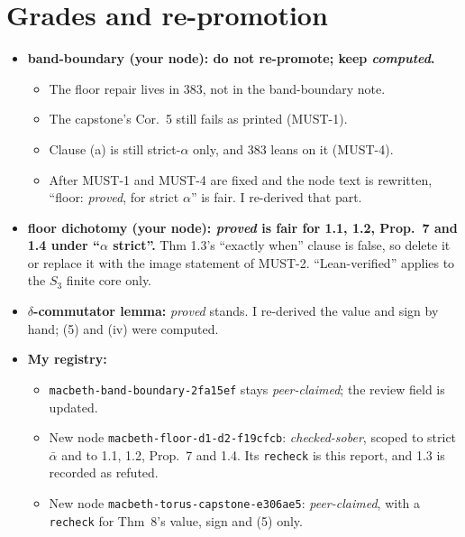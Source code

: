 \documentclass[10pt]{article}
\begin{document}
\section{Grades and re-promotion}
\begin{itemize}
\item \textbf{band-boundary (your node): do not re-promote; keep \emph{computed}.}
  \begin{itemize}
  \item The floor repair lives in 383, not in the band-boundary note.
  \item The capstone's Cor.~5 still fails as printed (MUST-1).
  \item Clause (a) is still strict-$\alpha$ only, and 383 leans on it (MUST-4).
  \item After MUST-1 and MUST-4 are fixed and the node text is rewritten, ``floor: \emph{proved}, for strict $\alpha$'' is fair. I re-derived that part.
  \end{itemize}
\item \textbf{floor dichotomy (your node): \emph{proved} is fair for 1.1, 1.2, Prop.~7 and 1.4 under ``$\alpha$ strict''.} Thm 1.3's ``exactly when'' clause is false, so delete it or replace it with the image statement of MUST-2. ``Lean-verified'' applies to the $S_3$ finite core only.
\item \textbf{$\delta$-commutator lemma:} \emph{proved} stands. I re-derived the value and sign by hand; (5) and (iv) were computed.
\item \textbf{My registry:}
  \begin{itemize}
  \item \texttt{macbeth-band-boundary-2fa15ef} stays \emph{peer-claimed}; the review field is updated.
  \item New node \texttt{macbeth-floor-d1-d2-f19cfcb}: \emph{checked-sober}, scoped to strict $\bar\alpha$ and to 1.1, 1.2, Prop.~7 and 1.4. Its \texttt{recheck} is this report, and 1.3 is recorded as refuted.
  \item New node \texttt{macbeth-torus-capstone-e306ae5}: \emph{peer-claimed}, with a \texttt{recheck} for Thm~8's value, sign and (5) only.
  \end{itemize}
\end{itemize}
\end{document}
